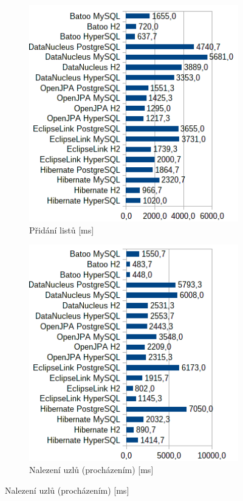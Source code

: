 \begin{figure}[!h]\ContinuedFloat
  \begin{subfigure}[b]{1\textwidth}
  \includegraphics[width=25em]{obr/bench/jpa5}
  \caption{Přidání listů [ms]}\label{img:jpa5}
  \end{subfigure}
  \begin{subfigure}[b]{1\textwidth}
  \includegraphics[width=25em]{obr/bench/jpa6}
  \caption{Nalezení uzlů (procházením) [ms]}\label{img:jpa6}
\end{subfigure}
\end{figure}

